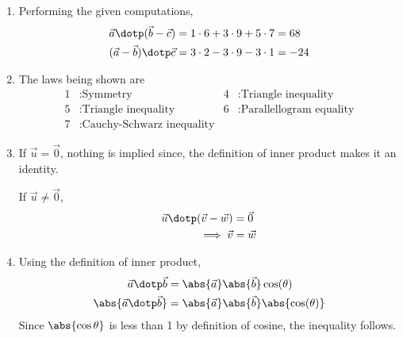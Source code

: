 \begin{enumerate}
    \item Performing the given computations,
          \begin{align}
              \vec{a} \dotp (\vec{b} - \vec{c}) &
              = 1 \cdot 6 + 3 \cdot 9 + 5 \cdot 7 = 68 \\
              (\vec{a} - \vec{b}) \dotp \vec{c} &
              = 3 \cdot 2 - 3 \cdot 9 - 3 \cdot 1 = -24
          \end{align}

    \item The laws being shown are
          \begin{align}
              1 & : \text{Symmetry}                  &
              4 & : \text{Triangle inequality}         \\
              5 & : \text{Triangle inequality}       &
              6 & : \text{Parallellogram equality}     \\
              7 & : \text{Cauchy-Schwarz inequality}
          \end{align}

    \item If $ \vec{u} = \vec{0} $, nothing is implied since, the definition of
          inner product makes it an identity. \par
          If $ \vec{u} \neq \vec{0} $,
          \begin{align}
              \vec{u} \dotp (\vec{v} - \vec{w}) & = \vec{0} \\
              \implies \vec{v}                  & = \vec{w}
          \end{align}

    \item Using the definition of inner product,
          \begin{align}
              \vec{a} \dotp \vec{b}       &
              = \abs{\vec{a}} \abs{\vec{b}} \cos(\theta)       \\
              \abs{\vec{a} \dotp \vec{b}} &
              = \abs{\vec{a}} \abs{\vec{b}} \abs{\cos(\theta)} \\
          \end{align}
          Since $ \abs{\cos \theta} $ is less than 1 by definition of cosine, the
          inequality follows.


\end{enumerate}

